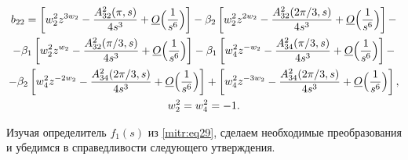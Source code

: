 \begin{gather*}

b_{22}=

\left[w^2_2 z^{3w_2}-\frac{A^2_{32}({\pi},s)}{4s^3}

+\underline O\Bigl(\frac1{s^6}\Bigr)\right]-

\beta_2\left[w^2_2z^{2w_2}-\frac{A^2_{32}({2\pi}/3,s)}{4s^3}

+\underline O\Bigl(\frac1{s^6}\Bigr)\right]- \\

-

\beta_1\left[w^2_2z^{w_2}-\frac{A^2_{32}({\pi}/3,s)}{4s^3}

+\underline O\Bigl(\frac1{s^6}\Bigr)\right]-

\beta_1\left[w^2_4z^{-w_2}-\frac{A^2_{34}({\pi}/3,s)}{4s^3}

+\underline O\Bigl(\frac1{s^6}\Bigr)\right]- \\

-

\beta_2\left[w^2_4z^{-2w_2}-\frac{A^2_{34}({2\pi}/3,s)}{4s^3}

+\underline O\Bigl(\frac1{s^6}\Bigr)\right]+

\left[w^2_4z^{-3w_2}-\frac{A^2_{34}({2\pi}/3,s)}{4s^3}

+\underline O\Bigl(\frac1{s^6}\Bigr)\right],  \\

w^2_2=w^2_4=-1. 

\end{gather*}



Изучая определитель $f_1(s)$ из \eqref{mitr:eq29}, сделаем необходимые преобразования и убедимся в справедливости следующего утверждения.



\smallskip




